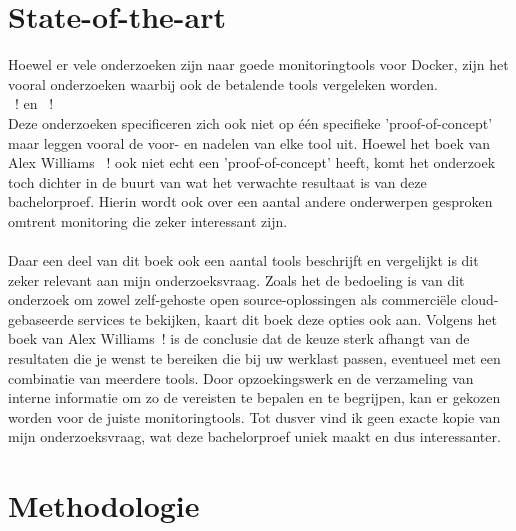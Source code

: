 
\section{State-of-the-art}
\label{sec:state-of-the-art}

Hoewel er vele onderzoeken zijn naar goede monitoringtools voor Docker, zijn het vooral onderzoeken waarbij ook de betalende tools vergeleken worden. \\~\autocite{Ribenzaft2020}! en ~\autocite{Cirelly2020}!\\ Deze onderzoeken specificeren zich ook niet op één specifieke 'proof-of-concept' maar leggen vooral de voor- en nadelen van elke tool uit.
Hoewel het boek van Alex Williams ~\autocite{2016}! ook niet echt een 'proof-of-concept' heeft, komt het onderzoek toch dichter in de buurt van wat het verwachte resultaat is van deze bachelorproef. Hierin wordt ook over een aantal andere onderwerpen gesproken omtrent monitoring die zeker interessant zijn. 
\\
\\
Daar een deel van dit boek ook een aantal tools beschrijft en vergelijkt is dit zeker relevant aan mijn onderzoeksvraag. Zoals het de bedoeling is van dit onderzoek om zowel zelf-gehoste open source-oplossingen als commerciële cloud-gebaseerde services te bekijken, kaart dit boek deze opties ook aan. Volgens het boek van Alex Williams~\autocite{2016}! is de conclusie dat de keuze sterk afhangt van de resultaten die je wenst te bereiken die bij uw werklast passen, eventueel met een combinatie van meerdere tools. Door opzoekingswerk en de verzameling van interne informatie om zo de vereisten te bepalen en te begrijpen, kan er gekozen worden voor de juiste monitoringtools. Tot dusver vind ik geen exacte kopie van mijn onderzoeksvraag, wat deze bachelorproef uniek maakt en dus interessanter.


\section{Methodologie}
\label{sec:methodologie}

